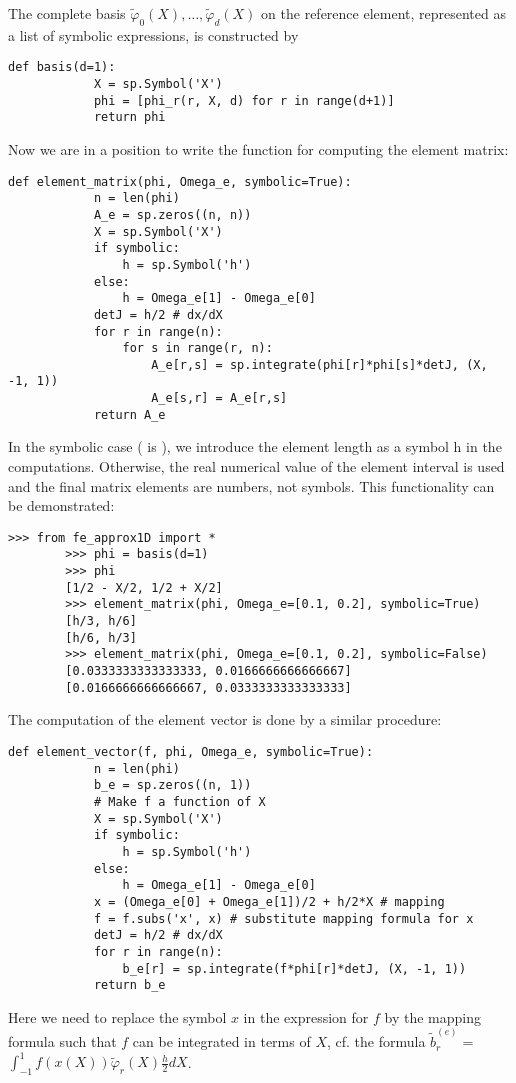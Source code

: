 \documentclass[../main.tex]{subfiles}
\begin{document}
	The complete basis $\tilde{\varphi}_{0}(X), \ldots, \tilde{\varphi}_{d}(X)$ on the reference element, represented as a list of symbolic expressions, is constructed by
	\begin{lstlisting}[numbers=none]
		def basis(d=1):
			X = sp.Symbol('X')
			phi = [phi_r(r, X, d) for r in range(d+1)]
			return phi	
	\end{lstlisting}
	Now we are in a position to write the function for computing the element matrix:
	\begin{lstlisting}[numbers=none]
		def element_matrix(phi, Omega_e, symbolic=True):
			n = len(phi)
			A_e = sp.zeros((n, n))
			X = sp.Symbol('X')
			if symbolic:
				h = sp.Symbol('h')
			else:
				h = Omega_e[1] - Omega_e[0]
			detJ = h/2 # dx/dX
			for r in range(n):
				for s in range(r, n):
					A_e[r,s] = sp.integrate(phi[r]*phi[s]*detJ, (X, -1, 1))
					A_e[s,r] = A_e[r,s]
			return A_e	
	\end{lstlisting}
	In the symbolic case ( is ), we introduce the element length as
	a symbol h in the computations. Otherwise, the real numerical value of the element interval  is used and the final matrix elements are numbers, not
	symbols. This functionality can be demonstrated:
	\begin{lstlisting}[numbers=none]
		>>> from fe_approx1D import *
		>>> phi = basis(d=1)
		>>> phi
		[1/2 - X/2, 1/2 + X/2]
		>>> element_matrix(phi, Omega_e=[0.1, 0.2], symbolic=True)
		[h/3, h/6]
		[h/6, h/3]
		>>> element_matrix(phi, Omega_e=[0.1, 0.2], symbolic=False)
		[0.0333333333333333, 0.0166666666666667]
		[0.0166666666666667, 0.0333333333333333]	
	\end{lstlisting}
	The computation of the element vector is done by a similar procedure:
	\begin{lstlisting}[numbers=none]
		def element_vector(f, phi, Omega_e, symbolic=True):
			n = len(phi)
			b_e = sp.zeros((n, 1))
			# Make f a function of X
			X = sp.Symbol('X')
			if symbolic:
				h = sp.Symbol('h')
			else:
				h = Omega_e[1] - Omega_e[0]
			x = (Omega_e[0] + Omega_e[1])/2 + h/2*X # mapping
			f = f.subs('x', x) # substitute mapping formula for x
			detJ = h/2 # dx/dX
			for r in range(n):
				b_e[r] = sp.integrate(f*phi[r]*detJ, (X, -1, 1))
			return b_e	
	\end{lstlisting}
	Here we need to replace the symbol $x$ in the expression for $f$ by the mapping formula such that $f$ can be integrated in terms of $X$, cf. the formula $\tilde{b}_{r}^{(e)}=$ $\int_{-1}^{1} f(x(X)) \tilde{\varphi}_{r}(X) \frac{h}{2} d X$.
	
\end{document}
